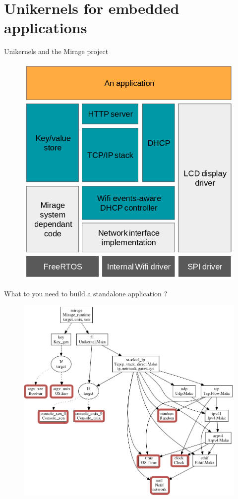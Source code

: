 \documentclass[10pt]{beamer}
\begin{document}
\section{Unikernels for embedded applications}
\begin{frame}{Unikernels and the Mirage project}
\begin{figure}
\includegraphics[height=0.95\textheight]{app.png}
\end{figure}
\end{frame}
\begin{frame}{What to you need to build a standalone application ?}
\begin{figure}
\includegraphics[height=0.95\textheight]{mirage_app.png}
\end{figure}
\end{frame}
\end{document}
